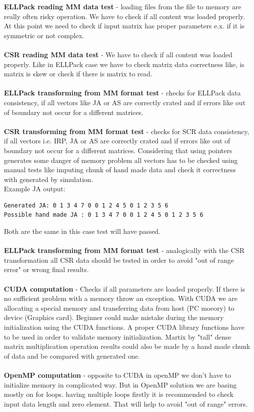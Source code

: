 \documentclass{scrreprt}
\begin{document}
\textbf{ELLPack reading MM data test} - loading files from the file to memory are really often risky operation. We have to check if all content was loaded properly.  At this point we need to check if input matrix has proper parameters e.x. if it is symmetric or not complex.
\\
\\
\textbf{CSR reading MM data test} -  We have to check if all content was loaded properly. Like in ELLPack case we have to check matrix data correctness like, is matrix is skew or check if there is matrix to read.
\\
\\
\textbf{ELLPack transforming from MM format test} - checks for ELLPack data consistency, if all vectors like JA or AS are correctly crated and if errors like out of boundary not occur for a different matrices. 
\\
\\
\textbf{CSR transforming from MM format test} - checks for SCR data consistency, if all vectors i.e. IRP, JA or AS are correctly crated and if errors like out of boundary not occur for a different matrices. Considering that using pointers generates some danger of memory problem all vectors has to be checked using manual tests like imputing chunk of hand made data and check it correctness with generated by simulation.
\\
Example JA output:
\begin{lstlisting}
Generated JA: 0 1 3 4 7 0 0 1 2 4 5 0 1 2 3 5 6
Possible hand made JA : 0 1 3 4 7 0 0 1 2 4 5 0 1 2 3 5 6
\end{lstlisting}
Both are the same in this case test will have passed.
\\
\\
\textbf{ELLPack transforming from MM format test} - analogically with the CSR transformation all CSR data should be tested in order to avoid "out of range error" or wrong final results.
\\
\\
\textbf{CUDA computation} -  Checks if all parameters are loaded properly. If there is no sufficient problem with a memory throw an exception. With CUDA we are allocating a special memory and transferring data from host (PC moeory) to device (Graphics card). Beginner could make mistake during the memory  initialization using the CUDA functions. A proper CUDA library functions have to be used in order to validate memory initialization. Martix by "tall" dense matrix multiplication operation results could also be made by a hand made chunk of data and be compared with generated one.
\\
\\
\textbf{OpenMP computation} - opposite to CUDA in openMP we don't have to initialize memory in complicated way. But in OpenMP solution we are basing mostly on for loops. having multiple loops firstly it is recommended to check input data length and zero element. That will help to avoid "out of range" errors.
\end{document}
